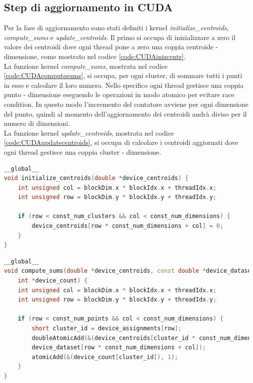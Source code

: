\documentclass[10pt,twocolumn,letterpaper]{article}
\begin{document}
\subsection{Step di aggiornamento in CUDA}
Per la fase di aggiornamento sono stati definiti i kernel \textit{initialize\_centroids}, \textit{compute\_sums} e \textit{update\_centroids}. Il primo si occupa di inizializzare a zero il valore dei centroidi dove ogni thread pone a zero una coppia centroide - dimensione, come mostrato nel codice \ref{code:CUDAinizcentr}.\\
La funzione kernel \textit{compute\_sums}, mostrata nel codice \ref{code:CUDAcomputesums}, si occupa, per ogni cluster, di sommare tutti i punti in esso e calcolare il loro numero. Nello specifico ogni thread gestisce una coppia punto - dimensione eseguendo le operazioni in modo atomico per evitare race condition. In questo modo l'incremento del contatore avviene per ogni dimensione del punto, quindi al momento dell'aggiornamento dei centroidi andrà diviso per il numero di dimensioni.\\
La funzione kernel \textit{update\_centroids}, mostrata nel codice \ref{code:CUDAupdatecentroids}, si occupa di calcolare i centroidi aggiornati dove ogni thread gestisce una coppia cluster - dimensione.\\
\begin{lstlisting}[language=c++, caption=Aggiornamento: \textit{initialize\_centroids}, label=code:CUDAinizcentr]
__global__
void initialize_centroids(double *device_centroids) {
	int unsigned col = blockDim.x * blockIdx.x + threadIdx.x;
	int unsigned row = blockDim.y * blockIdx.y + threadIdx.y;
	
	if (row < const_num_clusters && col < const_num_dimensions) {
		device_centroids[row * const_num_dimensions + col] = 0;
	}
}
\end{lstlisting}
\begin{lstlisting}[language=c++, caption=Aggiornamento: \textit{compute\_sums}, label=code:CUDAcomputesums]
__global__
void compute_sums(double *device_centroids, const double *device_dataset, const short *device_assignments,
	int *device_count) {
	int unsigned col = blockDim.x * blockIdx.x + threadIdx.x;
	int unsigned row = blockDim.y * blockIdx.y + threadIdx.y;
	
	if (row < const_num_points && col < const_num_dimensions) {
		short cluster_id = device_assignments[row];
		doubleAtomicAdd(&(device_centroids[cluster_id * const_num_dimensions + col]),
		device_dataset[row * const_num_dimensions + col]);
		atomicAdd(&(device_count[cluster_id]), 1);
	}
}
\end{lstlisting}
\end{document}
